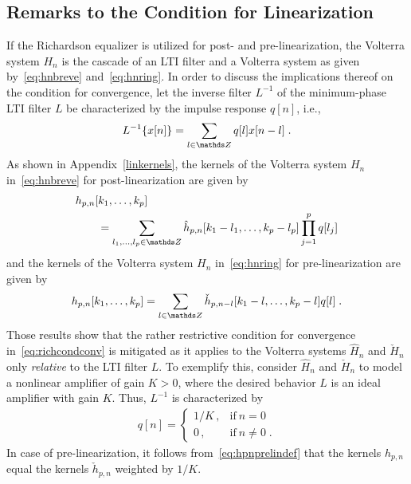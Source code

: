 \documentclass[10pt,twocolumn,twoside]{IEEEtran}
\begin{document}
\subsection{Remarks to the Condition for Linearization}

If the Richardson equalizer is utilized for post- and pre-linearization,
the Volterra system $H_n$ is the cascade of an LTI filter and a Volterra
system as given by~\eqref{eq:hnbreve} and~\eqref{eq:hnring}.
In order to discuss the implications thereof on the condition for convergence,
let the inverse filter $L^{-1}$ of the minimum-phase LTI filter $L$
be characterized by the impulse response $q[n]$, i.e.,
\begin{align}
	L^{-1}\{x[n]\} = \sum_{l\in\Z} q[l] x[n-l]\;.
	\label{eq:linvdefconv}
\end{align}
As shown in Appendix~\ref{linkernels}, the kernels of the Volterra
system $H_n$ in~\eqref{eq:hnbreve} for post-linearization are given by
\begin{align}
	\begin{split}
	&h_{p,n}[k_1,\dots,k_p] \\
		&\quad\quad= \sum_{l_1,\dots,l_p\in\Z}  \hat{h}_{p,n}[k_1-l_1,\dots,k_p-l_p] \prod_{j=1}^p q[l_j]
	\end{split}
	\label{eq:hpnpostlindef}
\end{align}
and the kernels of the Volterra system $H_n$ in~\eqref{eq:hnring}
for pre-linearization are given by
\begin{align}
	h_{p,n}[k_1,\dots,k_p]
		= \sum_{l\in\Z} \check{h}_{p,n-l}[k_1-l,\dots,k_p-l] q[l]\;.
	\label{eq:hpnprelindef}
\end{align}
Those results show that the rather restrictive condition for
convergence in~\eqref{eq:richcondconv} is mitigated as it applies
to the Volterra systems $\hat{H}_n$ and $\check{H}_n$ only \emph{relative}
to the LTI filter $L$. To exemplify this, consider $\hat{H}_n$ and
$\check{H}_n$ to model a nonlinear amplifier of gain $K>0$, where the
desired behavior $L$ is an ideal amplifier with gain $K$. Thus,
$L^{-1}$ is characterized by
\begin{align}
	q[n] =
		\left\{
			\begin{array}{ll}
				1/K\,, & \text{if}\ n = 0\\
				0\,,   & \text{if}\ n \neq 0\;.
			\end{array}
		\right.
	\label{eq:linvqdef}
\end{align}
In case of pre-linearization, it follows from~\eqref{eq:hpnprelindef}
that the kernels $h_{p,n}$ equal the kernels $\check{h}_{p,n}$ weighted by $1/K$.
\end{document}
